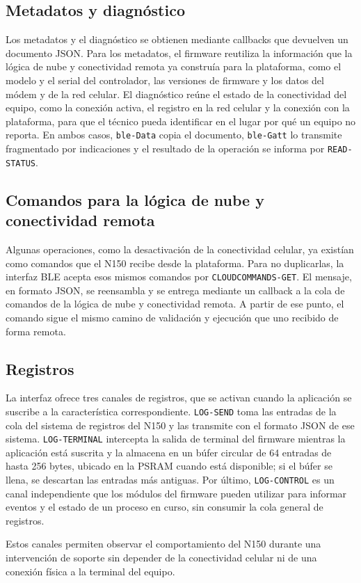 \FloatBarrier
\subsection{Metadatos y diagnóstico}
\label{subsec:integracion_metadatos}

Los metadatos y el diagnóstico se obtienen mediante callbacks que devuelven un documento JSON. Para los metadatos, el firmware reutiliza la información que la lógica de nube y conectividad remota ya construía para la plataforma, como el modelo y el serial del controlador, las versiones de firmware y los datos del módem y de la red celular. El diagnóstico reúne el estado de la conectividad del equipo, como la conexión activa, el registro en la red celular y la conexión con la plataforma, para que el técnico pueda identificar en el lugar por qué un equipo no reporta. En ambos casos, \texttt{ble-Data} copia el documento, \texttt{ble-Gatt} lo transmite fragmentado por indicaciones y el resultado de la operación se informa por \texttt{READ-STATUS}.

\subsection{Comandos para la lógica de nube y conectividad remota}
\label{subsec:integracion_nube}

Algunas operaciones, como la desactivación de la conectividad celular, ya existían como comandos que el N150 recibe desde la plataforma. Para no duplicarlas, la interfaz BLE acepta esos mismos comandos por \texttt{CLOUDCOMMANDS-GET}. El mensaje, en formato JSON, se reensambla y se entrega mediante un callback a la cola de comandos de la lógica de nube y conectividad remota. A partir de ese punto, el comando sigue el mismo camino de validación y ejecución que uno recibido de forma remota.

\subsection{Registros}
\label{subsec:integracion_registros}

La interfaz ofrece tres canales de registros, que se activan cuando la aplicación se suscribe a la característica correspondiente. \texttt{LOG-SEND} toma las entradas de la cola del sistema de registros del N150 y las transmite con el formato JSON de ese sistema. \texttt{LOG-TERMINAL} intercepta la salida de terminal del firmware mientras la aplicación está suscrita y la almacena en un búfer circular de 64 entradas de hasta 256 bytes, ubicado en la PSRAM cuando está disponible; si el búfer se llena, se descartan las entradas más antiguas. Por último, \texttt{LOG-CONTROL} es un canal independiente que los módulos del firmware pueden utilizar para informar eventos y el estado de un proceso en curso, sin consumir la cola general de registros.

Estos canales permiten observar el comportamiento del N150 durante una intervención de soporte sin depender de la conectividad celular ni de una conexión física a la terminal del equipo.
